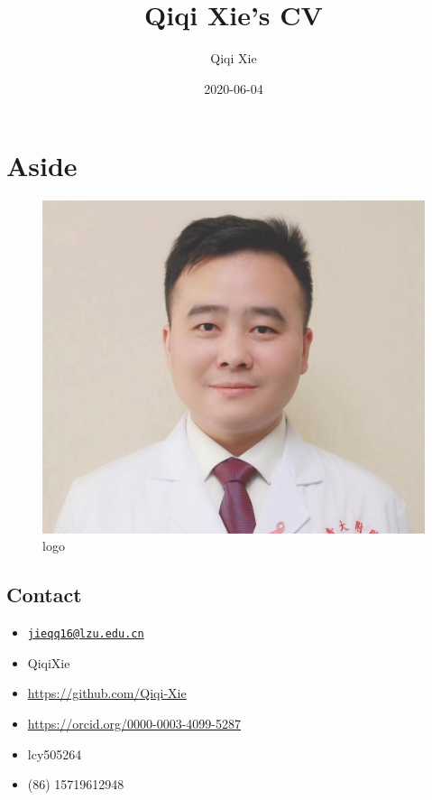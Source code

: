 \documentclass[
]{article}
\title{Qiqi Xie's CV}
\author{Qiqi Xie}
\date{2020-06-04}
\providecommand{\tightlist}{%
  \setlength{\itemsep}{0pt}\setlength{\parskip}{0pt}}
\begin{document}
\maketitle

\hypertarget{aside}{%
\section{Aside}\label{aside}}

\begin{figure}
\centering
\includegraphics[width=1\textwidth,height=\textheight]{xqq.jpg}
\caption{logo}
\end{figure}

\hypertarget{contact}{%
\subsection{Contact}\label{contact}}

\begin{itemize}
\tightlist
\item
  \href{mailto:jieqq16@lzu.edu.cn}{\nolinkurl{jieqq16@lzu.edu.cn}}
\item
  QiqiXie
\item
  \url{https://github.com/Qiqi-Xie}
\item
  \url{https://orcid.org/0000-0003-4099-5287}
\item
  lcy505264
\item
  (86) 15719612948
\end{itemize}
\end{document}
